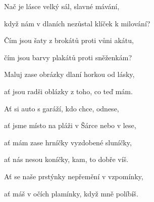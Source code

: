 \zs

Nač je lásce velký sál, slavné mávání,

když nám v dlaních nezůstal klíček k milování?

Čím jsou šaty z brokátů proti vůni akátu,

čím jsou barvy plakátů proti sněženkám?

\bigskip

Maluj zase obrázky dlaní horkou od lásky,

ať jsou radši oblázky z toho, co teď mám.
\ks



\zr
Ať si auto s garáží, kdo chce, odnese,

ať jsme místo na pláži v Šárce nebo v lese,

ať mám zase hrníčky vyzdobené sluníčky,

ať nás nesou koníčky, kam, to dobře víš.

\bigskip


Ať se naše prstýnky nepřemění v vzpomínky,

ať máš v očích plamínky, když mně políbíš.
\kr
\kp


